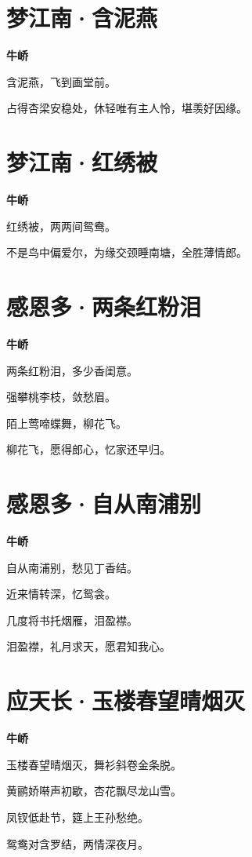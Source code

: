 \documentclass[12pt,a4paper]{ctexbook}
\begin{document}
\section{梦江南·含泥燕}
\textbf{牛峤}\par\vspace{0.5em}
含泥燕，飞到画堂前。\par
占得杏梁安稳处，休轻唯有主人怜，堪羡好因缘。\par

\section{梦江南·红绣被}
\textbf{牛峤}\par\vspace{0.5em}
红绣被，两两间鸳鸯。\par
不是鸟中偏爱尔，为缘交颈睡南塘，全胜薄情郎。\par

\section{感恩多·两条红粉泪}
\textbf{牛峤}\par\vspace{0.5em}
两条红粉泪，多少香闺意。\par
强攀桃李枝，敛愁眉。\par
陌上莺啼蝶舞，柳花飞。\par
柳花飞，愿得郎心，忆家还早归。\par

\section{感恩多·自从南浦别}
\textbf{牛峤}\par\vspace{0.5em}
自从南浦别，愁见丁香结。\par
近来情转深，忆鸳衾。\par
几度将书托烟雁，泪盈襟。\par
泪盈襟，礼月求天，愿君知我心。\par

\section{应天长·玉楼春望晴烟灭}
\textbf{牛峤}\par\vspace{0.5em}
玉楼春望晴烟灭，舞衫斜卷金条脱。\par
黄鹂娇啭声初歇，杏花飘尽龙山雪。\par
凤钗低赴节，筵上王孙愁绝。\par
鸳鸯对含罗结，两情深夜月。\par
\end{document}
